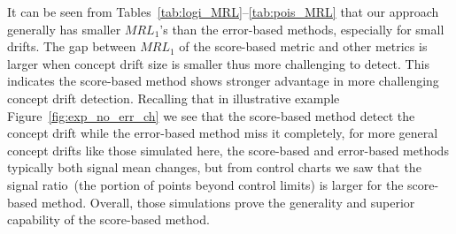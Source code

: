 \documentclass[twoside,11pt]{article}
\begin{document}
\begin{appendices}
It can be seen from Tables~\ref{tab:logi_MRL}--\ref{tab:pois_MRL} that our approach generally has smaller $MRL_1$'s than the error-based methods, especially for small drifts.
The gap between $MRL_1$ of the score-based metric and other metrics is larger when concept drift size is smaller thus more challenging to detect. This indicates the score-based method shows stronger advantage in more challenging concept drift detection. Recalling that in illustrative example Figure~\ref{fig:exp_no_err_ch} we see that the score-based method detect the concept drift while the error-based method miss it completely, for more general concept drifts like those simulated here, the score-based and error-based methods typically both signal mean changes, but from control charts we saw that the signal ratio~(the portion of points beyond control limits) is larger for the score-based method. Overall, those simulations prove the generality and superior capability of the score-based method.


\end{appendices}
\end{document}
